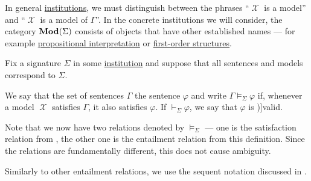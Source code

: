 \begin{remark}\label{rem:institutional_model_terminology}
  In general \hyperref[def:institution]{institutions}, we must distinguish between the phrases \enquote{\( \mscrX \) is a model} and \enquote{\( \mscrX \) is a model of \( \Gamma \)}. In the concrete institutions we will consider, the category \( \op*{Mod}(\Sigma) \) consists of objects that have other established names --- for example \hyperref[def:propositional_valuation/interpretation]{propositional interpretation} or \hyperref[def:first_order_structure]{first-order structures}.
\end{remark}

\begin{definition}\label{def:institutional_entailment}
  Fix a signature \( \Sigma \) in some \hyperref[def:institution]{institution} and suppose that all sentences and models correspond to \( \Sigma \).

  We say that the set of sentences \( \Gamma \)  the sentence \( \varphi \) and write \( \Gamma \vDash_\Sigma \varphi \) if, whenever a model \( \mscrX \) satisfies \( \Gamma \), it also satisfies \( \varphi \). If \( \vdash_\Sigma \varphi \), we say that \( \varphi \) is \term[en=valid (\cite[def. 2.2.1]{Hinman2005})]{valid}.
\end{definition}
\begin{comments}
  \item Note that we now have two relations denoted by \( \vDash_\Sigma \) --- one is the satisfaction relation from , the other one is the entailment relation from this definition. Since the relations are fundamentally different, this does not cause ambiguity.

  \item Similarly to other entailment relations, we use the sequent notation discussed in .
\end{comments}

